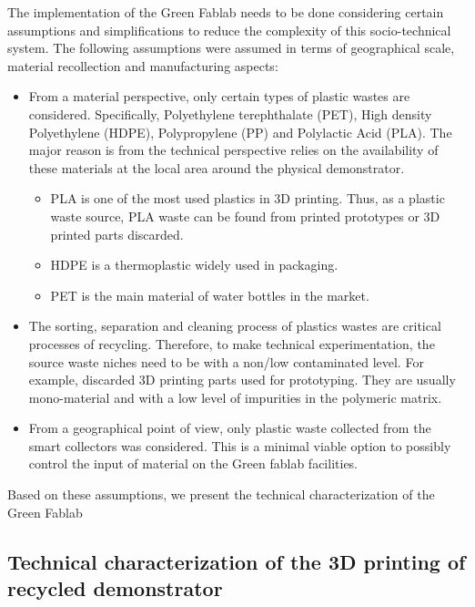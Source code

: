 \documentclass[
  11pt,
]{article}
\providecommand{\tightlist}{%
  \setlength{\itemsep}{0pt}\setlength{\parskip}{0pt}}\usepackage{longtable,booktabs,array}
\begin{document}
The implementation of the Green Fablab needs to be done considering
certain assumptions and simplifications to reduce the complexity of this
socio-technical system. The following assumptions were assumed in terms
of geographical scale, material recollection and manufacturing aspects:

\begin{itemize}
\item
  From a material perspective, only certain types of plastic wastes are
  considered. Specifically, Polyethylene terephthalate (PET), High
  density Polyethylene (HDPE), Polypropylene (PP) and Polylactic Acid
  (PLA). The major reason is from the technical perspective relies on
  the availability of these materials at the local area around the
  physical demonstrator.

  \begin{itemize}
  \tightlist
  \item
    PLA is one of the most used plastics in 3D printing. Thus, as a
    plastic waste source, PLA waste can be found from printed prototypes
    or 3D printed parts discarded.
  \item
    HDPE is a thermoplastic widely used in packaging.\\
  \item
    PET is the main material of water bottles in the market.
  \end{itemize}
\item
  The sorting, separation and cleaning process of plastics wastes are
  critical processes of recycling. Therefore, to make technical
  experimentation, the source waste niches need to be with a non/low
  contaminated level. For example, discarded 3D printing parts used for
  prototyping. They are usually mono-material and with a low level of
  impurities in the polymeric matrix.
\item
  From a geographical point of view, only plastic waste collected from
  the smart collectors was considered. This is a minimal viable option
  to possibly control the input of material on the Green fablab
  facilities.
\end{itemize}

Based on these assumptions, we present the technical characterization of
the Green Fablab

\hypertarget{technical-characterization-of-the-3d-printing-of-recycled-demonstrator}{%
\subsection{Technical characterization of the 3D printing of recycled
demonstrator}\label{technical-characterization-of-the-3d-printing-of-recycled-demonstrator}}
\end{document}
